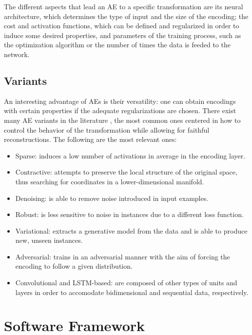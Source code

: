 The different aspects that lead an AE to a specific transformation are its neural architecture, which determines the type of input and the size of the encoding; the cost and activation functions, which can be defined and regularized in order to induce some desired properties, and parameters of the training process, such as the optimization algorithm or the number of times the data is feeded to the network.


\subsection{Variants}

An interesting advantage of AEs is their versatility: one can obtain encodings with certain properties if the adequate regularizations are chosen. There exist many AE variants in the literature , the most common ones centered in how to control the behavior of the transformation while allowing for faithful reconstructions. The following are the most relevant ones:

\begin{itemize}
\item Sparse: induces a low number of activations in average in the encoding layer.
\item Contractive: attempts to preserve the local structure of the original space, thus searching for coordinates in a lower-dimensional manifold.
\item Denoising: is able to remove noise introduced in input examples.
\item Robust: is less sensitive to noise in instances due to a different loss function.
\item Variational: extracts a generative model from the data and is able to produce new, unseen instances.
\item Adversarial: trains in an adversarial manner with the aim of forcing the encoding to follow a given distribution.
\item Convolutional and LSTM-based: are composed of other types of units and layers in order to accomodate bidimensional and sequential data, respectively.
\end{itemize}



\section{Software Framework }
\label{p2sec.framework}

